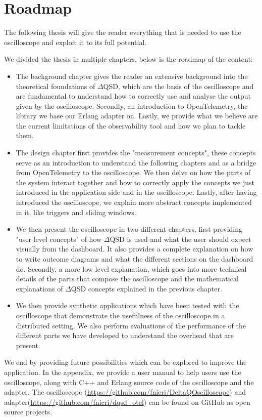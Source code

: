 \section{Roadmap}
    The following thesis will give the reader everything that is needed to use the oscilloscope and exploit it to its full potential.

    We divided the thesis in multiple chapters, below is the roadmap of the content:
    \begin{itemize}
        \item The background chapter gives the reader an extensive background into the theoretical foundations of $\Delta$QSD, which are the basis of the oscilloscope and are fundamental to understand how to correctly use and analyse the output given by the oscilloscope. Secondly, an introduction to OpenTelemetry, the library we base our Erlang adapter on. Lastly, we provide what we believe are the current limitations of the observability tool and how we plan to tackle them.
        \item The design chapter first provides the "measurement concepts", these concepts serve as an introduction to understand the following chapters and as a bridge from OpenTelemetry to the oscilloscope.  We then delve on how the parts of the system interact together and how to correctly apply the concepts we just introduced in the application side and in the oscilloscope. Lastly, after having introduced the oscilloscope, we explain more abstract concepts implemented in it, like triggers and sliding windows.
        \item We then present the oscilloscope in two different chapters, first providing "user level concepts" of how $\Delta$QSD is used and what the user should expect visually from the dashboard. It also provides a complete explanation on how to write outcome diagrams and what the different sections on the dashboard do.
            Secondly, a more low level explanation, which goes into more technical details of the parts that compose the oscilloscope and the mathematical explanations of $\Delta$QSD concepts explained in the previous chapter.
        \item We then provide synthetic applications which have been tested with the oscilloscope that demonstrate the usefulness of the oscilloscope in a distributed setting. We also perform evaluations of the performance of the different parts we have developed to understand the overhead that are present.
    \end{itemize}

    We end by providing future possibilities which can be explored to improve the application.    In the appendix, we provide a user manual to help users use the oscilloscope, along with C++ and Erlang source code of the oscilloscope and the adapter.
   \sloppy The oscilloscope (\url{https://github.com/fnieri/DeltaQOscilloscope}) and adapter(\url{https://github.com/fnieri/dqsd_otel}) can be found on GitHub as open source projects.
